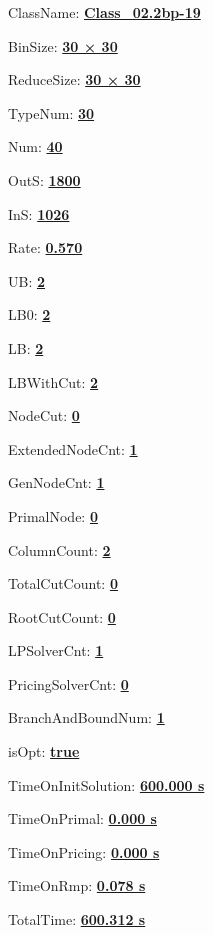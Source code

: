 \documentclass[11pt]{article}
\begin{document}
\pagestyle{empty}


ClassName: \underline{\textbf{Class_02.2bp-19}}
\par
BinSize: \underline{\textbf{30 × 30}}
\par
ReduceSize: \underline{\textbf{30 × 30}}
\par
TypeNum: \underline{\textbf{30}}
\par
Num: \underline{\textbf{40}}
\par
OutS: \underline{\textbf{1800}}
\par
InS: \underline{\textbf{1026}}
\par
Rate: \underline{\textbf{0.570}}
\par
UB: \underline{\textbf{2}}
\par
LB0: \underline{\textbf{2}}
\par
LB: \underline{\textbf{2}}
\par
LBWithCut: \underline{\textbf{2}}
\par
NodeCut: \underline{\textbf{0}}
\par
ExtendedNodeCnt: \underline{\textbf{1}}
\par
GenNodeCnt: \underline{\textbf{1}}
\par
PrimalNode: \underline{\textbf{0}}
\par
ColumnCount: \underline{\textbf{2}}
\par
TotalCutCount: \underline{\textbf{0}}
\par
RootCutCount: \underline{\textbf{0}}
\par
LPSolverCnt: \underline{\textbf{1}}
\par
PricingSolverCnt: \underline{\textbf{0}}
\par
BranchAndBoundNum: \underline{\textbf{1}}
\par
isOpt: \underline{\textbf{true}}
\par
TimeOnInitSolution: \underline{\textbf{600.000 s}}
\par
TimeOnPrimal: \underline{\textbf{0.000 s}}
\par
TimeOnPricing: \underline{\textbf{0.000 s}}
\par
TimeOnRmp: \underline{\textbf{0.078 s}}
\par
TotalTime: \underline{\textbf{600.312 s}}
\par
\newpage
\end{document}
